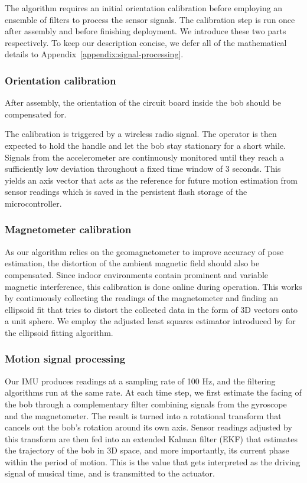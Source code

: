 \documentclass{nime-alternate} %
\begin{document}
The algorithm requires an initial orientation calibration before employing an ensemble of filters to process the sensor signals. The calibration step is run once after assembly and before finishing deployment. We introduce these two parts respectively. To keep our description concise, we defer all of the mathematical details to Appendix~\ref{appendix:signal-processing}.

\subsubsection{Orientation calibration}
After assembly, the orientation of the circuit board inside the bob should be compensated for.

The calibration is triggered by a wireless radio signal. The operator is then expected to hold the handle and let the bob stay stationary for a short while. Signals from the accelerometer are continuously monitored until they reach a sufficiently low deviation throughout a fixed time window of 3 seconds. This yields an axis vector that acts as the reference for future motion estimation from sensor readings which is saved in the persistent flash storage of the microcontroller.

\subsubsection{Magnetometer calibration}
As our algorithm relies on the geomagnetometer to improve accuracy of pose estimation, the distortion of the ambient magnetic field should also be compensated. Since indoor environments contain prominent and variable magnetic interference, this calibration is done online during operation. This works by continuously collecting the readings of the magnetometer and finding an ellipsoid fit that tries to distort the collected data in the form of 3D vectors onto a unit sphere. We employ the adjusted least squares estimator introduced by \cite{Markovsky_2004_ALS} for the ellipsoid fitting algorithm.

\subsubsection{Motion signal processing}
Our IMU produces readings at a sampling rate of 100 Hz, and the filtering algorithms run at the same rate. At each time step, we first estimate the facing of the bob through a complementary filter combining signals from the gyroscope and the magnetometer. The result is turned into a rotational transform that cancels out the bob's rotation around its own axis. Sensor readings adjusted by this transform are then fed into an extended Kalman filter (EKF) that estimates the trajectory of the bob in 3D space, and more importantly, its current phase within the period of motion. This is the value that gets interpreted as the driving signal of musical time, and is transmitted to the actuator.
\end{document}
